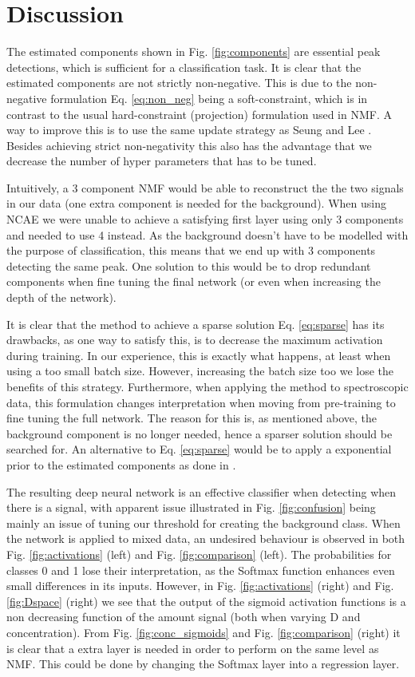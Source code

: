 \documentclass{article}
\begin{document}
\section{Discussion}
\label{sec:discussion}
The estimated components shown in Fig. \ref{fig:components} are essential peak detections, which is sufficient for a classification task. It is clear that the estimated components are not strictly non-negative. This is due to the non-negative formulation Eq. \eqref{eq:non_neg} being a soft-constraint, which is in contrast to the usual hard-constraint (projection) formulation used in NMF. A way to improve this is to use the same update strategy as Seung and Lee \cite{Seung1999}. Besides achieving strict non-negativity this also has the advantage that we decrease the number of hyper parameters that has to be tuned.

Intuitively, a 3 component NMF would be able to reconstruct the the two signals in our data (one extra component is needed for the background). When using NCAE we were unable to achieve a satisfying first layer using only 3 components and needed to use 4 instead. As the background doesn't have to be modelled with the purpose of classification, this means that we end up with 3 components detecting the same peak. One solution to this would be to drop redundant components when fine tuning the final network (or even when increasing the depth of the network).

It is clear that the method to achieve a sparse solution Eq. \eqref{eq:sparse} has its drawbacks, as one way to satisfy this, is to decrease the maximum activation during training. In our experience, this is exactly what happens, at least when using a too small batch size. However, increasing the batch size too we lose the benefits of this strategy. Furthermore, when applying the method to spectroscopic data, this formulation changes interpretation when moving from pre-training to fine tuning the full network. The reason for this is, as mentioned above, the background component is no longer needed, hence a sparser solution should be searched for. An alternative to Eq. \eqref{eq:sparse} would be to apply a exponential prior to the estimated components as done in \cite{snmf2006,ramanSNMF2014}.

The resulting deep neural network is an effective classifier when detecting when there is a signal, with apparent issue illustrated in Fig. \ref{fig:confusion} being mainly an issue of tuning our threshold for creating the background class. When the network is applied to mixed data, an undesired behaviour is observed in both Fig. \ref{fig:activations} (left) and Fig. \ref{fig:comparison} (left). The probabilities for classes 0 and 1 lose their interpretation, as the Softmax function enhances even small differences in its inputs. However, in Fig. \ref{fig:activations} (right) and Fig. \ref{fig:Dspace} (right) we see that the output of the sigmoid activation functions is a non decreasing function of the amount signal (both when varying D and concentration). From Fig. \ref{fig:conc_sigmoids} and Fig. \ref{fig:comparison} (right) it is clear that a extra layer is needed in order to perform on the same level as NMF. This could be done by changing the Softmax layer into a regression layer.
\end{document}
